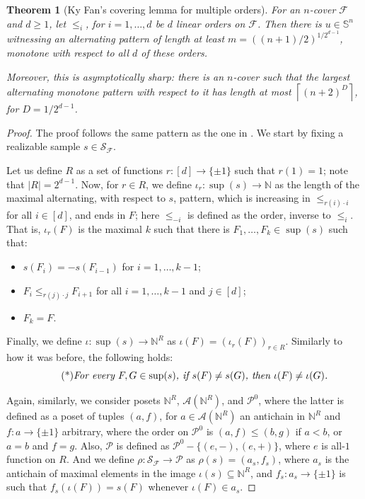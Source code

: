 \documentclass{article} %
\newcommand{\A}{\mathcal{A}}
\newcommand{\N}{\mathbb{N}}
\newcommand{\F}{\mathcal{F}}
\renewcommand{\S}{\mathcal{S}}
\renewcommand{\SS}{\mathbb{S}}
\newcommand{\PP}{\mathcal{P}}
\newtheorem{theorem}{Theorem}
\begin{document}
\begin{theorem}[Ky Fan's covering lemma for multiple orders]\label{th-kyfan-covers3}
	For an $n$-cover $\F$ and $d\geq 1$, let $\leq_i$, for $i=1, \dots, d$ be $d$ linear orders on $\F$. Then there is $u\in \SS^n$ witnessing an alternating pattern of length at least $m = \left((n+1)/2\right)^{1/2^{d-1}}$, monotone with respect to all $d$ of these orders. 

    Moreover, this is asymptotically sharp: there is an $n$-cover such that the largest alternating monotone pattern with respect to it has length at most $\left\lceil(n+2)^{D}\right\rceil$, for $D = 1/2^{d-1}$.
\end{theorem}
\begin{proof}
	The proof follows the same pattern as the one in . We start by fixing a realizable sample $s\in \S_\F$.
	
	Let us define $R$ as a set of functions $r\colon [d]\rightarrow \{\pm 1\}$ such that $r(1) = 1$; note that $|R| = 2^{d-1}$. Now, for $r\in R$, we define $\iota_r \colon \sup(s) \rightarrow \N$ as the length of the maximal alternating, with respect to $s$, pattern, which is increasing in $\leq_{r(i)\cdot i}$ for all $i\in [d]$, and ends in $F$; here $\leq_{-i}$ is defined as the order, inverse to $\leq_i$.  That is, $\iota_r(F)$ is the maximal $k$ such that there is $F_1, \dots, F_k \in \sup(s)$ such that:
		\begin{itemize}
			\item $s(F_i) = -s(F_{i-1})$ for $i=1, \dots, k-1$;
			\item $F_i \leq_{r(j)\cdot j} F_{i+1}$ for all $i=1, \dots, k-1$ and $j\in [d]$;
			\item $F_k = F$.
		\end{itemize}
	Finally, we define $\iota \colon \sup (s) \rightarrow \N^R$ as $\iota(F) = \left(\iota_r(F)\right)_{r\in R}$. Similarly to how it was before, the following holds:
		\begin{equation}\label{obs-iota2}\tag{*}
		\text{\emph{For every $F, G \in \sup(s)$, if $s(F)\neq s(G)$, then $\iota(F)\neq \iota(G)$.}}
		\end{equation}	
		
	Again, similarly, we consider posets $\N^R$, $\A(\N^R)$, and $\PP^0$, where the latter is defined as a poset of tuples $(a, f)$, for $a\in \A(\N^R)$ an antichain in $\N^R$ and $f\colon a\rightarrow \{\pm 1\}$ arbitrary, where the order on $\PP^0$ is $(a, f)\leq (b, g)$ if $a<b$, or $a=b$ and $f=g$. Also, $\PP$ is  defined as $\PP^0 - \{(e, -), (e, +)\}$, where $e$ is all-$1$ function on $R$. And we define $\rho \colon \S_\F \rightarrow \PP$ as $\rho(s) = (a_s, f_s)$, where $a_s$ is the antichain of maximal elements in the image $\iota(s)\subseteq \N^R$, and $f_s \colon a_s\rightarrow \{\pm 1\}$ is such that $f_s(\iota(F)) = s(F)$ whenever $\iota(F)\in a_s$.
	

\end{proof}
\end{document}
